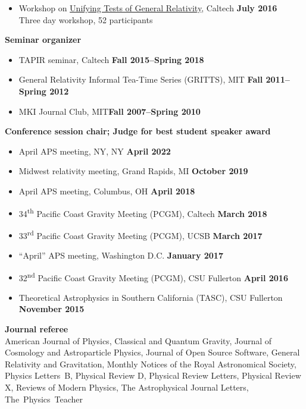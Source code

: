 \documentclass[margin,line]{res}
\begin{document}
\begin{resume}
\begin{itemize}
34\textsuperscript{th} Pacific Coast Gravity Meeting (PCGM),
Caltech
\hfill {\bf March 2018}\\
\hspace*{1em} Two-day conference, $\sim 125$ participants
\item[] Workshop on \href{http://www.tapir.caltech.edu/~unifying-gr-tests/}{Unifying Tests of General Relativity},
  Caltech \hfill {\bf July 2016} \\
\hspace*{1em} Three day workshop, 52 participants
\end{itemize}
{\bf Seminar organizer}
\vspace*{.05in}
\begin{itemize}
\item[] TAPIR seminar, Caltech\hfill
  {\bf Fall 2015--Spring 2018}
\item[] General Relativity Informal Tea-Time Series (GRITTS), MIT\hfill
  {\bf Fall 2011--Spring 2012}
\item[] MKI Journal Club, MIT\hfill {\bf Fall 2007--Spring 2010}
\end{itemize}
{\bf Conference session chair; Judge for best student speaker award}
\vspace*{.05in}
\begin{itemize}
\item[]
April APS meeting, NY, NY
\hfill {\bf April 2022}
\item[]
Midwest relativity meeting, Grand Rapids, MI
\hfill {\bf October 2019}
\item[]
April APS meeting, Columbus, OH
\hfill {\bf April 2018}
\item[]
34\textsuperscript{th} Pacific Coast Gravity Meeting (PCGM),
Caltech
\hfill {\bf March 2018}
\item[]
33\textsuperscript{rd} Pacific Coast Gravity Meeting (PCGM),
UCSB
\hfill {\bf March 2017}
\item[]
``April'' APS meeting, Washington D.C.
\hfill {\bf January 2017}
\item[]
32\textsuperscript{nd} Pacific Coast Gravity Meeting (PCGM),
CSU Fullerton
\hfill {\bf April 2016}
\item[]
Theoretical Astrophysics in Southern California (TASC),
CSU Fullerton
\hfill {\bf November 2015}
\end{itemize}

{\bf Journal referee}
\vspace*{.05in}\\
\hspace*{1em}
American Journal of Physics,
Classical and Quantum Gravity,
Journal of Cosmology and Astroparticle Physics,
Journal of Open Source Software,
General Relativity and Gravitation,
Monthly Notices of the Royal Astronomical Society,
Physics Letters~B,
Physical Review D,
Physical Review Letters,
Physical Review X,
Reviews of Modern Physics,
The Astrophysical Journal Letters,
The~Physics~Teacher


\end{resume}
\end{document}
